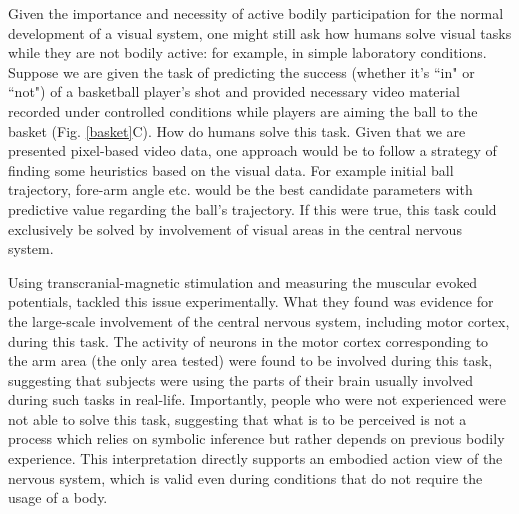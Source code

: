 Given the importance and necessity of active bodily participation for the
normal development of a visual system, one might still ask how humans solve
visual tasks while they are not bodily active: for example, in simple
laboratory conditions. Suppose we are given the task of predicting the
success (whether it's ``in" or  ``not") of a basketball player's shot and
provided necessary video material recorded under controlled conditions
while players are aiming the ball to the basket (Fig. \ref{basket}C). How
do humans solve this task. Given that we are presented pixel-based video
data, one approach would be to follow a strategy of finding some heuristics
based on the visual data. For example initial ball trajectory, fore-arm
angle etc. would be the best candidate parameters with predictive value
regarding the ball's trajectory. If this were true, this task could
exclusively be solved by involvement of visual areas in the central nervous
system. 

Using transcranial-magnetic stimulation and measuring the muscular evoked
potentials, \cite{aglioti2008a} tackled this issue experimentally. What
they found was evidence for the large-scale involvement of the central
nervous system, including motor cortex, during this task. The activity of
neurons in the motor cortex corresponding to the arm area (the only area
tested) were found to be involved during this task, suggesting that
subjects were using the parts of their brain usually involved during such
tasks in real-life. Importantly, people who were not experienced were not
able to solve this task, suggesting that what is to be perceived is not a
process which relies on symbolic inference but rather depends on previous
bodily experience. This interpretation directly supports an embodied action
view of the nervous system, which is valid even during conditions that do
not require the usage of a body.


